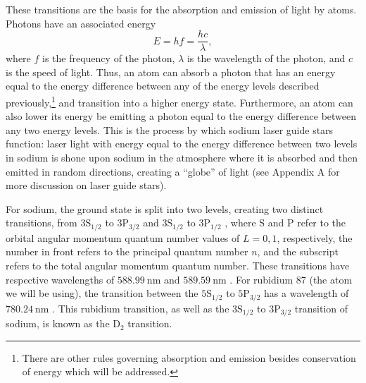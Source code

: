 

These transitions are the basis for the absorption and emission of light by atoms. Photons have an associated energy
\begin{equation}
  E = h f = \frac{hc}{\lambda},
  \label{energyfrequency}
\end{equation}
%
where $f$ is the frequency of the photon, $\lambda$ is the wavelength of the photon, and $c$ is the speed of light. Thus, an atom can absorb a photon that has an energy equal to the energy difference between any of the energy levels described previously,\footnote{There are other rules governing absorption and emission besides conservation of energy which will be addressed.} and transition into a higher energy state. Furthermore, an atom can also lower its energy be emitting a photon equal to the energy difference between any two energy levels. This is the process by which sodium laser guide stars function: laser light with energy equal to the energy difference between two levels in sodium is shone upon sodium in the atmosphere where it is absorbed and then emitted in random directions, creating a ``globe'' of light (see Appendix A for more discussion on laser guide stars).



For sodium, the ground state is split into two levels, creating two distinct transitions, from $3\text{S}_{1/2}$ to $3\text{P}_{3/2}$ and $3\text{S}_{1/2}$ to $3\text{P}_{1/2}$ \cite{Kibblewhite2009}, where S and P refer to the orbital angular momentum quantum number values of $L = 0,1$, respectively, the number in front refers to the principal quantum number $n$, and the subscript refers to the total angular momentum quantum number. These transitions have respective wavelengths of $\SI{588.99}{\nano\meter}$ and $\SI{589.59}{\nano\meter}$ \cite{Kibblewhite2009}. For rubidium 87 (the atom we will be using), the transition between the $5\text{S}_{1/2}$ to $5\text{P}_{3/2}$ has a wavelength of $\SI{780.24}{\nano \meter}$ \cite{steck}. This rubidium transition, as well as the $3\text{S}_{1/2}$ to $3\text{P}_{3/2}$ transition of sodium, is known as the $\text{D}_2$ transition. 





